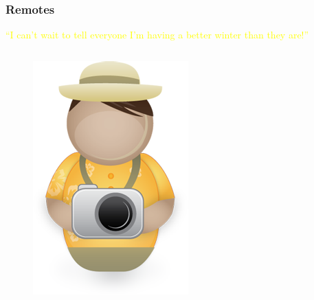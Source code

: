 \documentclass[glossy]{beamer}
\begin{document}
\begin{frame}[fragile=singleslide]
  \frametitle{Remotes}

  \textcolor{yellow}{\enquote{I can't wait to tell everyone I'm having a better winter than they are!}}
  \begin{columns}
    \begin{column}{4cm}
      \begin{figure}
        \centering
        \includegraphics[width=0.9\columnwidth]{tourist}
      \end{figure}

    \end{column}

    \begin{column}{8cm}
      \begin{figure}
        \centering
        
      \end{figure}


\end{column}
\end{columns}
\end{frame}
\end{document}
